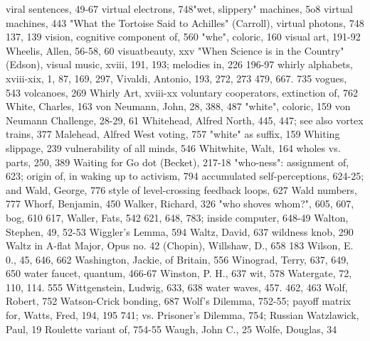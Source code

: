 viral sentences, 49-67 virtual electrons, 748"wet, slippery" machines, 5o8
 virtual machines, 443                       "What the Tortoise Said to Achilles" (Carroll),
virtual photons, 748                          137, 139
vision, cognitive component of, 560          "whe", coloric, 160
visual art, 191-92                           Wheelis, Allen, 56-58, 60
visuatbeauty, xxv                            "When Science is in the Country" (Edson),
visual music, xviii, 191, 193; melodies in,   226
 196-97                                      whirly alphabets, xviii-xix, 1, 87, 169, 297,
Vivaldi, Antonio, 193, 272, 273               479, 667. 735
vogues, 543 volcanoes, 269                   Whirly Art, xviii-xx
voluntary cooperators, extinction of, 762    White, Charles, 163
von Neumann, John, 28, 388, 487              "white", coloric, 159
von Neumann Challenge, 28-29, 61             Whitehead, Alfred North, 445, 447; see also
vortex trains, 377                            Malehead, Alfred West
voting, 757                                  "white" as suffix, 159 Whiting slippage, 239
vulnerability of all minds, 546              Whitwhite, Walt, 164
                                             wholes vs. parts, 250, 389
Waiting for Go dot (Becket), 217-18          "who-ness": assignment of, 623; origin of, in
waking up to activism, 794                    accumulated self-perceptions, 624-25; and
Wald, George, 776                             style of level-crossing feedback loops, 627
Wald numbers, 777                             Whorf, Benjamin, 450
Walker, Richard, 326                         "who shoves whom?", 605, 607, bog, 610 617,
Waller, Fats, 542                             621, 648, 783; inside computer, 648-49
Walton, Stephen, 49, 52-53                   Wiggler's Lemma, 594
Waltz, David, 637                            wildness knob, 290
Waltz in A-flat Major, Opus no. 42 (Chopin), Willshaw, D., 658
 183                                         Wilson, E. 0., 45, 646, 662
Washington, Jackie, of Britain, 556          Winograd, Terry, 637, 649, 650
water faucet, quantum, 466-67                Winston, P. H., 637 wit, 578
Watergate, 72, 110, 114. 555                 Wittgenstein, Ludwig, 633, 638
water waves, 457. 462, 463                   Wolf, Robert, 752
Watson-Crick bonding, 687                    Wolf's Dilemma, 752-55; payoff matrix for,
Watts, Fred, 194, 195                         741; vs. Prisoner's Dilemma, 754; Russian
Watzlawick, Paul, 19                          Roulette variant of, 754-55
Waugh, John C., 25                           Wolfe, Douglas, 34
